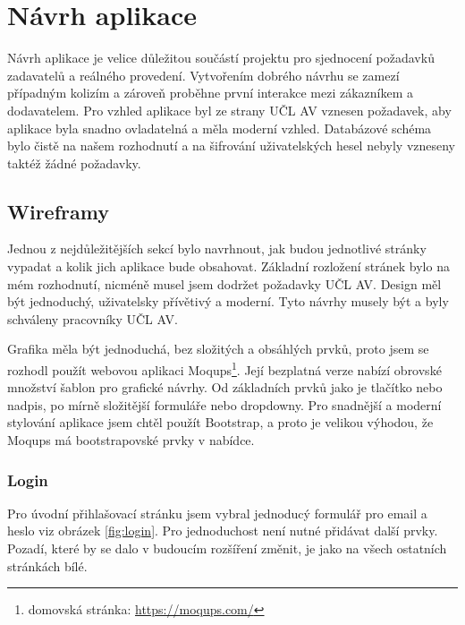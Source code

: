 \chapter{Návrh aplikace}
    Návrh aplikace je velice důležitou součástí projektu pro sjednocení požadavků zadavatelů a reálného provedení. Vytvořením dobrého návrhu se zamezí případným kolizím a zároveň proběhne první interakce mezi zákazníkem a dodavatelem. Pro vzhled aplikace byl ze strany UČL AV vznesen požadavek, aby aplikace byla snadno ovladatelná a měla moderní vzhled. Databázové schéma bylo čistě na našem rozhodnutí a na šifrování uživatelských hesel nebyly vzneseny taktéž žádné požadavky.
    
    

    \section{Wireframy}
        Jednou z nejdůležitějších sekcí bylo navrhnout, jak budou jednotlivé stránky vypadat a kolik jich aplikace bude obsahovat. Základní rozložení stránek bylo na mém rozhodnutí, nicméně musel jsem dodržet požadavky UČL AV. Design měl být jednoduchý, uživatelsky přívětivý a moderní. Tyto návrhy musely být a byly schváleny pracovníky UČL AV. 
        
        Grafika měla být jednoduchá, bez složitých a obsáhlých prvků, proto jsem se rozhodl použít webovou aplikaci Moqups\footnote{domovská stránka: \url{https://moqups.com/}}. Její bezplatná verze nabízí obrovské množství šablon pro grafické návrhy. Od základních prvků jako je tlačítko nebo nadpis, po mírně složitější formuláře nebo dropdowny. Pro snadnější a moderní stylování aplikace jsem chtěl použít Bootstrap, a proto je velikou výhodou, že Moqups má bootstrapovské prvky v nabídce. 
        
        \subsection{Login}
            Pro úvodní přihlašovací stránku jsem vybral jednoducý formulář pro email a heslo viz obrázek \ref{fig:login}. Pro jednoduchost není nutné přidávat další prvky. Pozadí, které by se dalo v budoucím rozšíření změnit, je jako na všech ostatních stránkách bílé.
            
